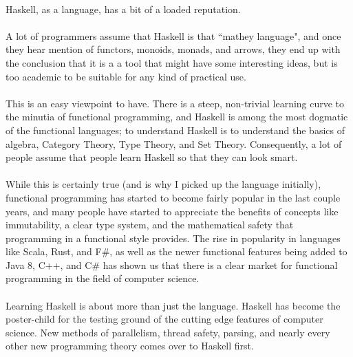 \begin{foreword}

\paragraph{}
Haskell, as a language, has a bit of a loaded reputation.  

\paragraph{}
A lot of programmers assume that Haskell is that ``mathey language", and once they hear mention of functors, monoids, monads, and arrows, they end up with the conclusion that it is a a tool that might have some interesting ideas, but is too academic to be suitable for any kind of practical use. 

\paragraph{}
This is an easy viewpoint to have.  There is a steep, non-trivial learning curve to the minutia of functional programming, and Haskell is among the most dogmatic of the functional languages; to understand Haskell is to understand the basics of algebra, Category Theory, Type Theory, and Set Theory.  Consequently, a lot of people assume that people learn Haskell so that they can look smart. 

\paragraph{}
While this is certainly true (and is why I picked up the language initially), functional programming has started to become fairly popular in the last couple years, and many people have started to appreciate the benefits of concepts like immutability, a clear type system, and the mathematical safety that programming in a functional style provides. The rise in popularity in languages like Scala, Rust, and F\#, as well as the newer functional features being added to Java 8, C++, and C\# has shown us that there is a clear market for functional programming in the field of computer science. 

\paragraph{}
Learning Haskell is about more than just the language. Haskell has become the poster-child for the testing ground of the cutting edge features of computer science. New methods of parallelism, thread safety, parsing, and nearly every other new programming theory comes over to Haskell first. 


\end{foreword}

